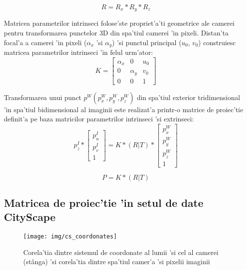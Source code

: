 \documentclass[12pt,a4paper,twoside]{report}
\begin{document}
\begin{equation}
R = R_x * R_y * R_z
\label{eq:3}
\end{equation}

Matricea parametrilor intrinseci folose'ste propriet'a'ti geometrice ale camerei pentru transformarea punctelor 3D din spa'tiul camerei 'in pixeli. Distan'ta focal'a a camerei 'in pixeli ($\alpha_x$ 'si $\alpha_y$) 'si punctul principal ($u_0$, $v_0$) construiesc matricea parametrilor intrinseci 'in felul urm'ator:
\[
K = 
	\begin{bmatrix}
	\alpha_x & 0 & u_0 \\
	0 & \alpha_y & v_0\\
	0 & 0 & 1
	\end{bmatrix}
\]

Transformarea unui punct $p^W(p_x^W, p_y^W, p_z^W)$ din spa'tiul exterior tridimensional 'in spa'tiul bidimensional al imaginii este realizat'a printr-o matrice de proiec'tie definit'a pe baza matricilor parametrilor intrinseci 'si extrinseci:
\begin{equation}
p_z^I * \begin{bmatrix}
	p_u^I \\
	p_v^I \\
	1
	\end{bmatrix}
= K *(R|T) * \begin{bmatrix}
	p_x^W\\
	p_y^W\\
	p_z^W\\
	1
\end{bmatrix}
\end{equation}

\begin{equation}\label{eq:1}
P = K *(R|T)
\end{equation}

\newpage
\subsection{Matricea de proiec'tie 'in setul de date CityScape}
\begin{figure}[H]
  \texttt{[image: img/cs\_coordonates]}
  \centering
  \caption{Corela'tia dintre sistemul de coordonate al lumii 'si cel al camerei (st\^anga) 'si corela'tia dintre spa'tiul camer'a 'si pixelii imaginii \protect\footnotemark}
  \label{fig:cs}
\end{figure}\
\end{document}

